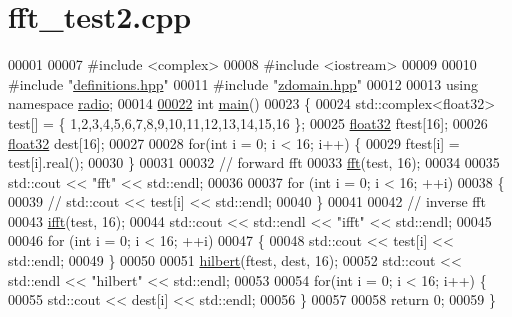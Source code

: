 \hypertarget{fft__test2_8cpp_source}{\section{fft\+\_\+test2.\+cpp}
\label{fft__test2_8cpp_source}
}

\begin{DoxyCode}
00001 
00007 \textcolor{preprocessor}{#include <complex>}
00008 \textcolor{preprocessor}{#include <iostream>}
00009 
00010 \textcolor{preprocessor}{#include "\hyperlink{definitions_8hpp}{definitions.hpp}"}
00011 \textcolor{preprocessor}{#include "\hyperlink{zdomain_8hpp}{zdomain.hpp}"}
00012 
00013 \textcolor{keyword}{using namespace }\hyperlink{namespaceradio}{radio};
00014 
\hypertarget{fft__test2_8cpp_source_l00022}{}\hyperlink{fft__test2_8cpp_ae66f6b31b5ad750f1fe042a706a4e3d4}{00022} \textcolor{keywordtype}{int} \hyperlink{fft__test2_8cpp_ae66f6b31b5ad750f1fe042a706a4e3d4}{main}()
00023 \{
00024     std::complex<float32> test[] = \{ 1,2,3,4,5,6,7,8,9,10,11,12,13,14,15,16 \};
00025     \hyperlink{definitions_8hpp_aacdc525d6f7bddb3ae95d5c311bd06a1}{float32} ftest[16];   
00026     \hyperlink{definitions_8hpp_aacdc525d6f7bddb3ae95d5c311bd06a1}{float32} dest[16];
00027 
00028     \textcolor{keywordflow}{for}(\textcolor{keywordtype}{int} i = 0; i < 16; i++) \{
00029         ftest[i] = test[i].real();
00030     \}
00031 
00032     \textcolor{comment}{// forward fft}
00033     \hyperlink{namespaceradio_ab146b5bf7f1c005939b024c9c4910a77}{fft}(test, 16);
00034 
00035     std::cout << \textcolor{stringliteral}{"fft"} << std::endl;
00036 
00037     \textcolor{keywordflow}{for} (\textcolor{keywordtype}{int} i = 0; i < 16; ++i)
00038     \{
00039     \textcolor{comment}{//  std::cout << test[i] << std::endl;}
00040     \}
00041 
00042     \textcolor{comment}{// inverse fft}
00043     \hyperlink{namespaceradio_a51add4e2faf6d58cabc3b4a3892420eb}{ifft}(test, 16);
00044     std::cout << std::endl << \textcolor{stringliteral}{"ifft"} << std::endl;
00045 
00046     \textcolor{keywordflow}{for} (\textcolor{keywordtype}{int} i = 0; i < 16; ++i)
00047     \{
00048         std::cout << test[i] << std::endl;
00049     \}
00050 
00051     \hyperlink{namespaceradio_a285a47b4ed81e5662d2b6b4bae0188d0}{hilbert}(ftest, dest, 16);
00052     std::cout << std::endl << \textcolor{stringliteral}{"hilbert"} << std::endl;
00053 
00054     \textcolor{keywordflow}{for}(\textcolor{keywordtype}{int} i = 0; i < 16; i++) \{
00055         std::cout << dest[i] << std::endl;
00056     \}
00057 
00058     \textcolor{keywordflow}{return} 0;
00059 \}
\end{DoxyCode}
